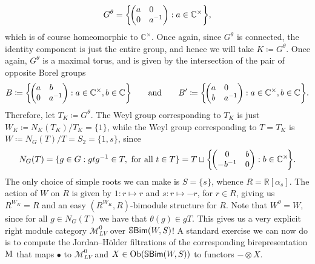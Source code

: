 \begin{example}
\begin{align*}
\begin{split}
G^\theta = \left\{\!\begin{pmatrix}a&0\hphantom{{}^{-1}}\\0&a^{-1}\end{pmatrix} : a \in \mathbb{C}^\times\right\}\!,
\end{split}
\end{align*}
\noindent which is of course homeomorphic to $\mathbb{C}^\times$. Once again, since $G^\theta$ is connected, the identity component is just the entire group, and hence we will take $K \coloneqq G^\theta$. Once again, $G^\theta$ is a maximal torus, and is given by the intersection of the pair of opposite Borel groups
\begin{align*}
\begin{split}
B \coloneqq \left\{\!\begin{pmatrix}a&b\hphantom{{}^{-1}}\\0&a^{-1}\end{pmatrix} : a \in \mathbb{C}^\times, b \in \mathbb{C}\right\}\!\qquad\text{and}\qquad B' \coloneqq \left\{\!\begin{pmatrix}a&0\hphantom{{}^{-1}}\\b&a^{-1}\end{pmatrix} : a \in \mathbb{C}^\times, b \in \mathbb{C}\right\}\!.
\end{split}
\end{align*}
\noindent Therefore, let $T_K \coloneqq G^\theta$. The Weyl group corresponding to $T_K$ is just $W_K \coloneqq N_K(T_K)/T_K = \{1\}$, while the Weyl group corresponding to $T = T_K$ is $W \coloneqq N_G(T)/T = S_2 = \{1, s\}$, since
\begin{align*}
\begin{split}
N_G(T) = \{g \in G : gtg^{-1} \in T,\ \textnormal{for all $t \in T$}\} = T \sqcup \left\{\!\begin{pmatrix}0&b\\-b^{-1}&0\end{pmatrix} : b \in \mathbb{C}^\times\!\right\}\!.
\end{split}
\end{align*}
\noindent %
The only choice of simple roots we can make is $S = \{s\}$, whence $R = \mathbb{R}[\alpha_{s}]$. The action of $W$ on $R$ is given by $1 : r \mapsto r$ and $s : r \mapsto -r$, for $r \in R$, giving us $R^{W_K} = R$ and an easy $(R^{W_K}, R)$-bimodule structure for $R$. Note that $W^\theta = W$, since for all $g \in N_G(T)$ we have that $\theta(g) \in gT$. This gives us a very explicit right module category $\mathcal{M}_{LV}^0$ over $\mathbb{S}\textnormal{\textsf{Bim}}(W, S)$! A standard exercise we can now do is to compute the Jordan--H\"{o}lder filtrations of the corresponding birepresentation $\textnormal{M}$ that maps $\bullet$ to $\mathcal{M}_{LV}^0$ and $X \in \textnormal{Ob}(\mathbb{S}\textnormal{\textsf{Bim}}(W, S))$ to functors $- \otimes X$.\\[-1.5\baselineskip]%

\end{example}
